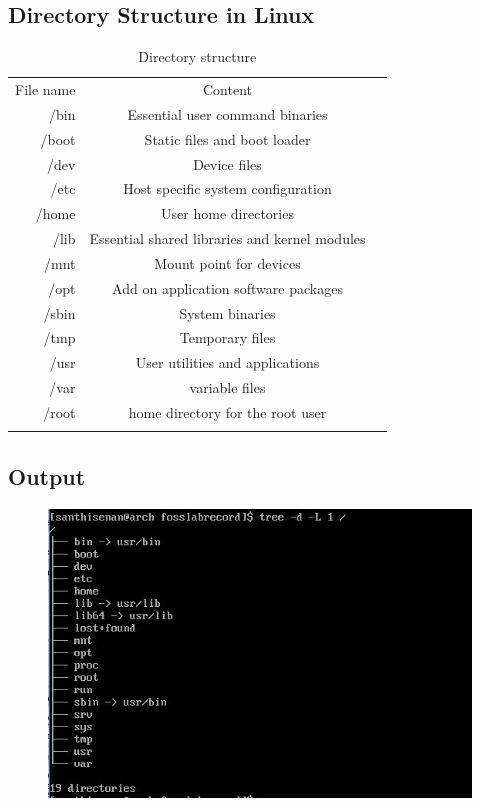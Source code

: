 \documentclass{article}
\begin{document}
\subsection{Directory Structure in Linux}
\begin{table}[htb]
\caption{Directory structure}
\label{Directory Structure in Linux}
\begin{tabular}{rcc}
\noalign{\smallskip} \hline \hline \noalign{\smallskip}
File name & Content\\
/bin & Essential user command binaries\\
/boot & Static files and boot loader\\
/dev & Device files\\
/etc & Host specific system configuration\\
/home & User home directories\\
/lib & Essential shared libraries and kernel modules\\
/mnt & Mount point for devices\\
/opt & Add on application software packages\\
/sbin & System binaries\\
/tmp & Temporary files\\
/usr & User utilities and applications\\
/var &variable files\\
/root & home directory for the root user\\ 
\hline
\noalign{\smallskip} \hline \noalign{\smallskip}
\end{tabular}
\end{table}


\subsection{Output}
\begin{figure}[h!]
	\includegraphics[width=\linewidth]{./outputs/exp1.jpg}
\end{figure}
\end{document}
